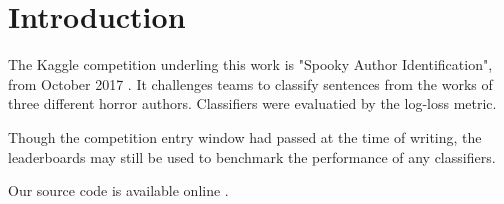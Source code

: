 \section{Introduction}
\label{sec:intro}
The Kaggle competition underling this work is "Spooky Author Identification", from October 2017 \cite{kaggle}. It challenges teams to classify sentences from the works of three
different horror authors. Classifiers were evaluatied by the log-loss metric.

Though the competition entry window had passed at the time of writing, the leaderboards may still be used to benchmark the performance of any classifiers.

Our source code is available online \cite{source-code}.